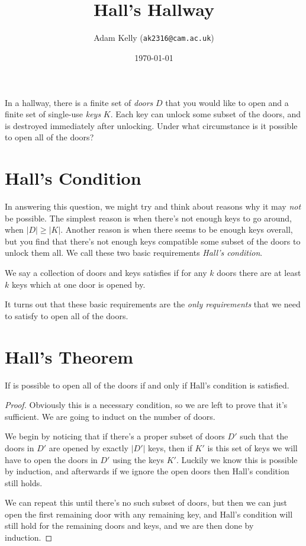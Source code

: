 \documentclass[11pt]{article}
\title{\vspace{-3.25\baselineskip}\ \\Hall's Hallway}
\author{Adam Kelly (\texttt{ak2316@cam.ac.uk})}
\date{\today}
\begin{document}
\maketitle

In a hallway, there is a finite set of \emph{doors} $D$ that you would like to open and a finite set of single-use \emph{keys} $K$. Each key can unlock some subset of the doors, and is destroyed immediately after unlocking. Under what circumstance is it possible to open all of the doors?

\section{Hall's Condition}

In answering this question, we might try and think about reasons why it may \emph{not} be possible. The simplest reason is when there's not enough keys to go around, when $|D| \geq |K|$. Another reason is when there seems to be enough keys overall, but you find that there's not enough keys compatible some subset of the doors to unlock them all. We call these two basic requirements \emph{Hall's condition}.

\begin{definition*}
	We say a collection of doors and keys satisfies  if for any $k$ doors there are at least $k$ keys which at one door is opened by. 
\end{definition*}

It turns out that these basic requirements are the \emph{only requirements} that we need to satisfy to open all of the doors.

\section{Hall's Theorem}

\begin{theorem}
	If is possible to open all of the doors if and only if Hall's condition is satisfied.
\end{theorem}
\begin{proof}
Obviously this is a necessary condition, so we are left to prove that it's sufficient. We are going to induct on the number of doors. 

We begin by noticing that if there's a proper subset of doors $D'$ such that the doors in $D'$ are opened by exactly $|D'|$ keys, then if $K'$ is this set of keys we will have to open the doors in $D'$ using the keys $K'$. Luckily we know this is possible by induction, and afterwards if we ignore the open doors then Hall's condition still holds.

We can repeat this until there's no such subset of doors, but then we can just open the first remaining door with any remaining key, and Hall's condition will still hold for the remaining doors and keys, and we are then done by induction.
\end{proof}
\end{document}
